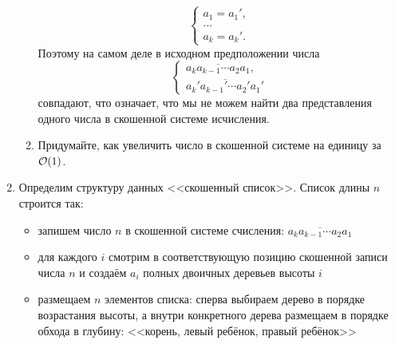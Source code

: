 \begin{enumerate}
\begin{enumerate}
\begin{solution}
\begin{equation}
\begin{cases}
            a_1=a_1',\\
            \ldots\\
            a_k=a_k'.
          \end{cases}
        \end{equation}
        Поэтому на самом деле в исходном предположении числа
        \begin{equation}
          \begin{cases}
            \overline{a_k a_{k-1} \cdots a_2 a_1}, \\
            \overline{a_k' a_{k-1}' \cdots a_2' a_1'}
          \end{cases}
        \end{equation}
        совпадают, что означает, что мы не можем найти два представления одного числа в скошенной системе исчисления.
      \end{solution}
      \item Придумайте, как увеличить число в скошенной системе на
        единицу за $\mathcal{O}(1)$.
    \end{enumerate}

  \item
    Определим структуру данных <<скошенный список>>. Список длины $n$ строится так:
    \begin{itemize}
		\item запишем число $n$ в скошенной системе счисления: $\overline{a_k a_{k-1} \cdots a_2 a_1}$
		\item для каждого $i$ смотрим в соответствующую позицию скошенной записи числа $n$ и создаём $a_i$ полных двоичных деревьев высоты $i$
		\item размещаем $n$ элементов списка: сперва выбираем дерево в порядке возрастания высоты, а внутри конкретного дерева размещаем в порядке обхода в глубину: <<корень, левый ребёнок, правый ребёнок>>
	\end{itemize}


\end{enumerate}
